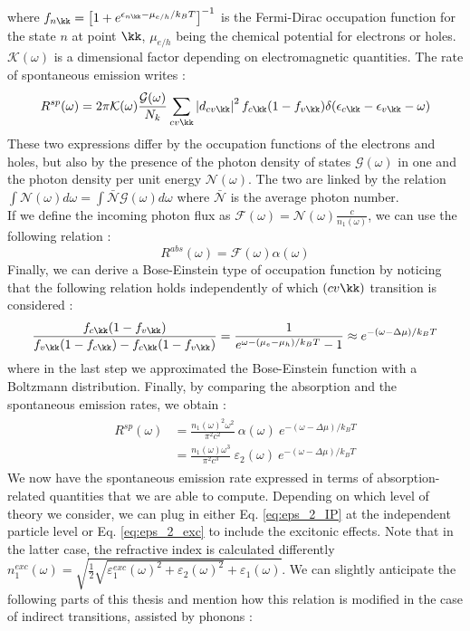 where $f_{n\kk} = \left[ 1 + e^{\epsilon_{n\kk} - \mu_{e/h}/k_BT} \right]^{-1}$ is the Fermi-Dirac occupation function for the state $n$ at point $\kk$, $\mu_{e/h}$ being the chemical potential for electrons or holes. $\mathcal{K}(\omega)$ is a dimensional factor depending on electromagnetic quantities. The rate of spontaneous emission writes : 
\begin{equation}
	R^{sp}(\omega) = 2\pi \mathcal{K}(\omega) \frac{\mathcal{G} (\omega)}{N_k} \sum_{cv\kk} \left|d_{cv\kk} \right|^2 f_{c\kk}(1-f_{v\kk}) \delta(\epsilon_{c\kk} - \epsilon_{v\kk} - \omega)
\end{equation}
These two expressions differ by the occupation functions of the electrons and holes, but also by the presence of the photon density of states $\mathcal{G}(\omega)$ in one and the photon density per unit energy $\mathcal{N}(\omega)$. The two are linked by the relation $ \int\mathcal{N}(\omega) d\omega = \int \bar{\mathcal{N}} \mathcal{G}(\omega) d\omega$ where $\bar{\mathcal{N}}$ is the average photon number. \\
If we define the incoming photon flux as $\mathcal{F}(\omega) = \mathcal{N}(\omega) \frac{c}{n_1(\omega)}$, we can use the following relation :
\begin{equation}
	R^{abs}(\omega) = \mathcal{F}(\omega) \alpha(\omega)
\end{equation}
Finally, we can derive a Bose-Einstein type of occupation function by noticing that the following relation holds independently of which $(cv\kk)$ transition is considered :
\begin{equation}
	\frac{f_{c\kk} (1-f_{v\kk})}{f_{v\kk} (1-f_{c\kk}) - f_{c\kk}(1-f_{v\kk})} = \frac{1}{e^{\omega - (\mu_e - \mu_h)/k_BT} - 1 }\approx e^{-(\omega - \Delta \mu)/k_BT}
\end{equation}
where in the last step we approximated the Bose-Einstein function with a Boltzmann distribution.
Finally, by comparing the absorption and the spontaneous emission rates, we obtain :
\begin{align}
\begin{split}
	R^{sp}(\omega) &= \frac{n_1(\omega)^2\omega^2}{\pi^2 c^2}\ \alpha(\omega)\ e^{-(\omega - \Delta \mu)/k_BT} \\
	 &= \frac{n_1(\omega)\omega^3}{\pi^2 c^3}\ \varepsilon_2(\omega)\ e^{-(\omega - \Delta \mu)/k_BT} \label{eq:vRS_PL}
\end{split}
\end{align}
We now have the spontaneous emission rate expressed in terms of absorption-related quantities that we are able to compute. Depending on which level of theory we consider, we can plug in either Eq. \eqref{eq:eps_2_IP} at the independent particle level or Eq. \eqref{eq:eps_2_exc} to include the excitonic effects. Note that in the latter case, the refractive index is calculated differently $n_1^{exc}(\omega) = \sqrt{\tfrac{1}{2}\sqrt{\varepsilon_1^{exc}(\omega)^2+\varepsilon_2(\omega)^2} + \varepsilon_1(\omega)}$. We can slightly anticipate the following parts of this thesis and mention how this relation is modified in the case of indirect transitions, assisted by phonons :
